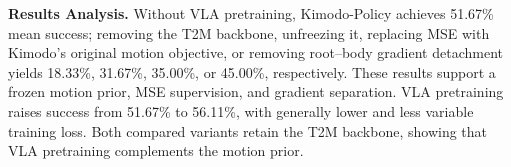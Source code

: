 \textbf{Results Analysis.} Without VLA pretraining, Kimodo-Policy achieves 51.67\% mean success; removing the T2M backbone, unfreezing it, replacing MSE with Kimodo's original motion objective, or removing root--body gradient detachment yields 18.33\%, 31.67\%, 35.00\%, or 45.00\%, respectively. These results support a frozen motion prior, MSE supervision, and gradient separation. VLA pretraining raises success from 51.67\% to 56.11\%, with generally lower and less variable training loss. Both compared variants retain the T2M backbone, showing that VLA pretraining complements the motion prior.

\endgroup
\endgroup
